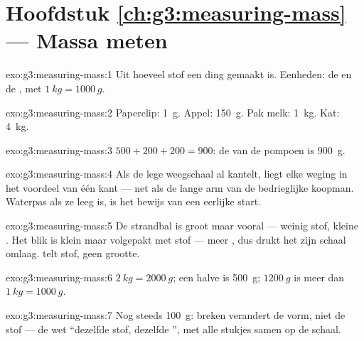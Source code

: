 \section*{Hoofdstuk \ref{ch:g3:measuring-mass} --- Massa meten}

\begin{solution}{exo:g3:measuring-mass:1}
Uit hoeveel stof een ding gemaakt is. Eenheden: de  en de
, met $\qty{1}{kg} = \qty{1000}{g}$.
\end{solution}

\begin{solution}{exo:g3:measuring-mass:2}
Paperclip: \qty{1}{g}. Appel: \qty{150}{g}. Pak melk: \qty{1}{kg}.
Kat: \qty{4}{kg}.
\end{solution}

\begin{solution}{exo:g3:measuring-mass:3}
$500 + 200 + 200 = 900$: de  van de pompoen is \qty{900}{g}.
\end{solution}

\begin{solution}{exo:g3:measuring-mass:4}
Als de lege weegschaal al kantelt, liegt elke weging in het voordeel
van één kant --- net als de lange arm van de bedrieglijke koopman.
Waterpas als ze leeg is, is het bewijs van een eerlijke start.
\end{solution}

\begin{solution}{exo:g3:measuring-mass:5}
De strandbal is groot maar vooral  --- weinig stof, kleine
. Het blik is klein maar volgepakt met stof --- meer
, dus drukt het zijn schaal omlaag.  telt stof, geen
grootte.
\end{solution}

\begin{solution}{exo:g3:measuring-mass:6}
$\qty{2}{kg} = \qty{2000}{g}$; een halve  is \qty{500}{g};
$\qty{1200}{g}$ is meer dan $\qty{1}{kg} = \qty{1000}{g}$.
\end{solution}

\begin{solution}{exo:g3:measuring-mass:7}
Nog steeds \qty{100}{g}: breken verandert de vorm, niet de stof --- de
wet ``dezelfde stof, dezelfde '', met alle stukjes samen op de
schaal.
\end{solution}

